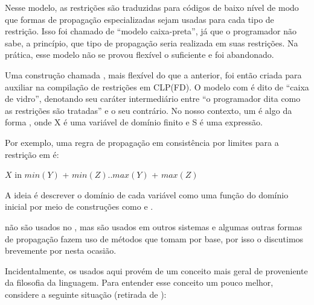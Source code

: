 \documentclass{article}
\begin{document}
Nesse modelo, as restrições são traduzidas para códigos de baixo nível de modo que formas de propagação especializadas sejam
usadas para cada tipo de restrição. Isso foi chamado de ``modelo caixa-preta'', já que o programador não sabe,
a princípio, que tipo de propagação seria realizada em suas restrições. Na prática, esse modelo não se provou flexível o suficiente
e foi abandonado.

Uma construção chamada , mais flexível do que a anterior, foi então criada para auxiliar na compilação de
restrições em CLP(FD). O modelo com  é dito de ``caixa de vidro'', denotando seu caráter intermediário entre
``o programador dita como as restrições são tratadas'' e o seu contrário. No nosso contexto, um
 é algo da forma , onde X é uma variável de domínio finito e S é uma expressão.

Por exemplo, uma regra de propagação em consistência por limites para a restrição 
em  é:

    $X$ in $min(Y)$ + $min(Z)..max(Y)$ + $max(Z)$

A ideia é descrever o domínio de cada variável como uma função do domínio inicial por meio de
construções como  e .

 não são usados no \eclipse, mas são usados em outros sistemas e algumas outras formas de propagação fazem
uso de métodos que tomam  por base, por isso o discutimos brevemente por nesta ocasião.

Incidentalmente, os  usados aqui provém de um conceito mais geral de
 proveniente da filosofia da linguagem.
Para entender esse conceito um pouco melhor, considere a seguinte situação (retirada de \cite{raymond}):
\end{document}
